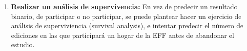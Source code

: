 \begin{enumerate}
\begin{enumerate}[noitemsep]
        \item \textbf{Realizar un análisis de supervivencia:} En vez de predecir un resultado binario, de participar o no participar, se puede plantear hacer un ejercicio de análisis de superviviencia (survival analysis), e intentar predecir el número de ediciones en las que participará un hogar de la EFF antes de abandonar el estudio.
    \end{enumerate}
\end{enumerate}